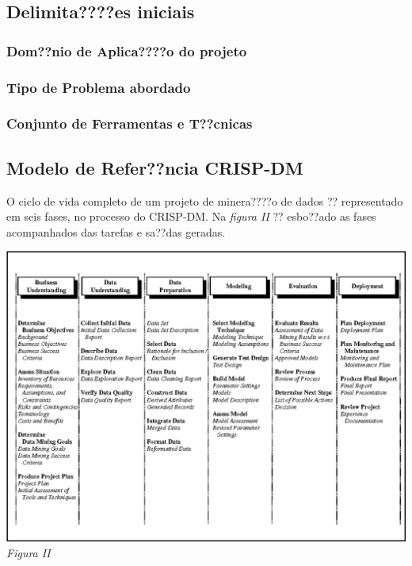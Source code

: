 \documentclass[]{article}
\begin{document}
\subsection{Delimita????es iniciais}\label{delimitaes-iniciais}

\subsubsection{Dom??nio de Aplica????o do
projeto}\label{domnio-de-aplicao-do-projeto}

\subsubsection{Tipo de Problema
abordado}\label{tipo-de-problema-abordado}

\subsubsection{Conjunto de Ferramentas e
T??cnicas}\label{conjunto-de-ferramentas-e-tcnicas}

\subsection{Modelo de Refer??ncia
CRISP-DM}\label{modelo-de-referncia-crisp-dm}

O ciclo de vida completo de um projeto de minera????o de dados ??
representado em seis fases, no processo do CRISP-DM. Na \emph{figura II}
?? esbo??ado as fases acompanhados das tarefas e sa??das geradas.

\includegraphics{images/crisp-dm-phases.png} \emph{Figura II}
\end{document}
